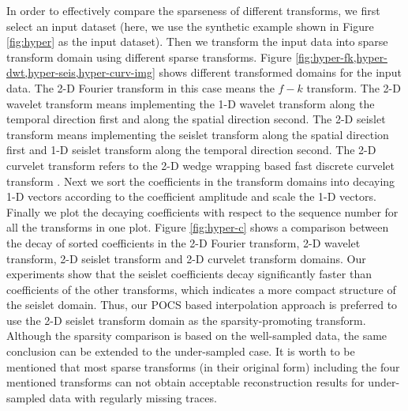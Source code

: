 In order to effectively compare the sparseness of different transforms, we first select an input dataset (here, we use the synthetic example shown in Figure \ref{fig:hyper} as the input dataset). Then we transform the input data into sparse transform domain using different sparse transforms. Figure \ref{fig:hyper-fk,hyper-dwt,hyper-seis,hyper-curv-img} shows different transformed domains for the input data. The 2-D Fourier transform in this case means the $f-k$ transform. The 2-D wavelet transform means implementing the 1-D wavelet transform along the temporal direction first and along the spatial direction second. The 2-D seislet transform means implementing the seislet transform along the spatial direction first and 1-D seislet transform along the temporal direction second. The 2-D curvelet transform refers to the 2-D wedge wrapping based fast discrete curvelet transform \cite{candes20061}. Next we sort the coefficients in the transform domains into decaying 1-D vectors according to the coefficient amplitude and scale the 1-D vectors. Finally we plot the decaying coefficients with respect to the sequence number for all the transforms in one plot. Figure \ref{fig:hyper-c} shows a comparison between the decay of sorted coefficients in the 2-D Fourier transform, 2-D wavelet transform, 2-D seislet transform and 2-D curvelet transform domains. Our experiments show that the seislet coefficients decay significantly faster than coefficients of the other transforms, which indicates a more compact structure of the seislet domain. Thus, our POCS based interpolation approach is preferred to use the 2-D seislet transform domain as the sparsity-promoting transform. Although the sparsity comparison is based on the well-sampled data, the same conclusion can be extended to the under-sampled case. It is worth to be mentioned that most sparse transforms (in their original form) including the four mentioned transforms can not obtain acceptable reconstruction results for under-sampled data with regularly missing traces.




